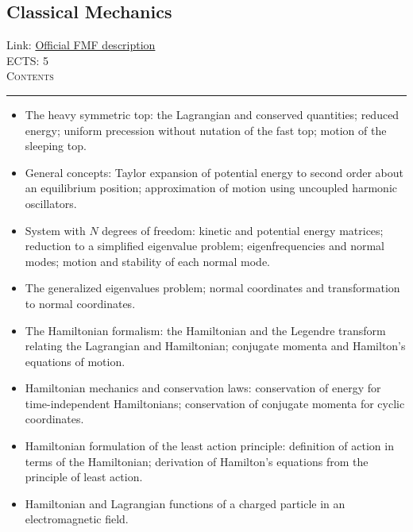 \documentclass[11pt, a4paper]{article}
\newenvironment{course}[3]{
\subsection{#1}%
Link: \href{#2}{Official FMF description}\\%
ECTS: #3%
\vspace{1ex}
\\
{\large \textsc{Contents}}\\[-0.9ex]%
\rule{\textwidth}{0.5pt}
\vspace{-3ex}
}
{}
\newenvironment{chapter}[1]{
\begin{tcolorbox}[title=#1, breakable]
}
{\end{tcolorbox}}
\begin{document}
\begin{course}{Classical Mechanics}{https://www.fmf.uni-lj.si/en/study-physics/programmes/1fiz/2020/7000777/courses/1155/}{5}
\begin{chapter}{Rigid body dynamics}
\begin{itemize}
            \item The heavy symmetric top: the Lagrangian and conserved quantities; reduced energy; uniform precession without nutation of the fast top; motion of the sleeping top.
        \end{itemize}
    \end{chapter}

    \begin{chapter}{Small oscillations}
        \begin{itemize}
        
            \item General concepts: Taylor expansion of potential energy to second order about an equilibrium position; approximation of motion using uncoupled harmonic oscillators.

            \item System with $ N $ degrees of freedom: kinetic and potential energy matrices; reduction to a simplified eigenvalue problem; eigenfrequencies and normal modes; motion and stability of each normal mode.

            \item The generalized eigenvalues problem; normal coordinates and transformation to normal coordinates.
        
        \end{itemize}
    \end{chapter}

    \begin{chapter}{Hamiltonian mechanics}
        \begin{itemize}
        
            \item The Hamiltonian formalism: the Hamiltonian and the Legendre transform relating the Lagrangian and Hamiltonian; conjugate momenta and Hamilton's equations of motion.

            \item Hamiltonian mechanics and conservation laws: conservation of energy for time-independent Hamiltonians; conservation of conjugate momenta for cyclic coordinates.

            \item Hamiltonian formulation of the least action principle: definition of action in terms of the Hamiltonian; derivation of Hamilton's equations from the principle of least action.

            \item Hamiltonian and Lagrangian functions of a charged particle in an electromagnetic field.


\end{itemize}
\end{chapter}
\end{course}
\end{document}

